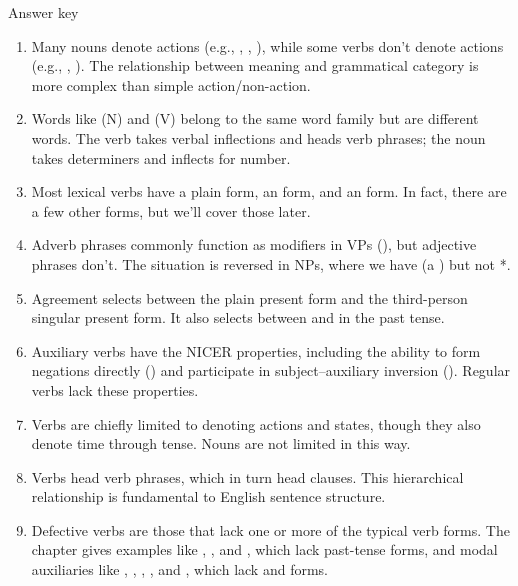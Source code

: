 \begin{tblsfilled}{Answer key}

\begin{enumerate}[noitemsep, leftmargin=*]
    \item Many nouns denote actions (e.g., , , ), while some verbs don't denote actions (e.g., , ). The relationship between meaning and grammatical category is more complex than simple action/non-action.

    \item Words like  (N) and  (V) belong to the same word family but are different words. The verb takes verbal inflections and heads verb phrases; the noun takes determiners and inflects for number.

    \item Most lexical verbs have a plain form, an  form, and an  form. In fact, there are a few other forms, but we'll cover those later.

    \item Adverb phrases commonly function as modifiers in VPs (), but adjective phrases don't. The situation is reversed in NPs, where we have (a ) but not *.

    \item Agreement selects between the plain present form and the third-person singular present form. It also selects between  and  in the past tense.

    \item Auxiliary verbs have the NICER properties, including the ability to form negations directly () and participate in subject--auxiliary inversion (). Regular verbs lack these properties.

    \item Verbs are chiefly limited to denoting actions and states, though they also denote time through tense. Nouns are not limited in this way.

    \item Verbs head verb phrases, which in turn head clauses. This hierarchical relationship is fundamental to English sentence structure.

    \item Defective verbs are those that lack one or more of the typical verb forms. The chapter gives examples like , , and , which lack past-tense forms, and modal auxiliaries like , , , , and , which lack  and  forms.
\end{enumerate}

\end{tblsfilled}

